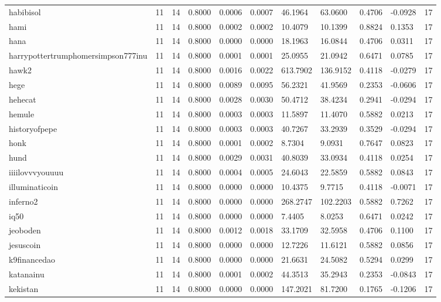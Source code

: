\begin{table}[htbp]
\begin{tabular}{lllllllllll}
habibisol & 11 & 14 & 0.8000 & 0.0006 & 0.0007 & 46.1964 & 63.0600 & 0.4706 & -0.0928 & 17 \\
hami & 11 & 14 & 0.8000 & 0.0002 & 0.0002 & 10.4079 & 10.1399 & 0.8824 & 0.1353 & 17 \\
hana & 11 & 14 & 0.8000 & 0.0000 & 0.0000 & 18.1963 & 16.0844 & 0.4706 & 0.0311 & 17 \\
harrypottertrumphomersimpson777inu & 11 & 14 & 0.8000 & 0.0001 & 0.0001 & 25.0955 & 21.0942 & 0.6471 & 0.0785 & 17 \\
hawk2 & 11 & 14 & 0.8000 & 0.0016 & 0.0022 & 613.7902 & 136.9152 & 0.4118 & -0.0279 & 17 \\
hege & 11 & 14 & 0.8000 & 0.0089 & 0.0095 & 56.2321 & 41.9569 & 0.2353 & -0.0606 & 17 \\
hehecat & 11 & 14 & 0.8000 & 0.0028 & 0.0030 & 50.4712 & 38.4234 & 0.2941 & -0.0294 & 17 \\
hemule & 11 & 14 & 0.8000 & 0.0003 & 0.0003 & 11.5897 & 11.4070 & 0.5882 & 0.0213 & 17 \\
historyofpepe & 11 & 14 & 0.8000 & 0.0003 & 0.0003 & 40.7267 & 33.2939 & 0.3529 & -0.0294 & 17 \\
honk & 11 & 14 & 0.8000 & 0.0001 & 0.0002 & 8.7304 & 9.0931 & 0.7647 & 0.0823 & 17 \\
hund & 11 & 14 & 0.8000 & 0.0029 & 0.0031 & 40.8039 & 33.0934 & 0.4118 & 0.0254 & 17 \\
iiiilovvvyouuuu & 11 & 14 & 0.8000 & 0.0004 & 0.0005 & 24.6043 & 22.5859 & 0.5882 & 0.0843 & 17 \\
illuminaticoin & 11 & 14 & 0.8000 & 0.0000 & 0.0000 & 10.4375 & 9.7715 & 0.4118 & -0.0071 & 17 \\
inferno2 & 11 & 14 & 0.8000 & 0.0000 & 0.0000 & 268.2747 & 102.2203 & 0.5882 & 0.7262 & 17 \\
iq50 & 11 & 14 & 0.8000 & 0.0000 & 0.0000 & 7.4405 & 8.0253 & 0.6471 & 0.0242 & 17 \\
jeoboden & 11 & 14 & 0.8000 & 0.0012 & 0.0018 & 33.1709 & 32.5958 & 0.4706 & 0.1100 & 17 \\
jesuscoin & 11 & 14 & 0.8000 & 0.0000 & 0.0000 & 12.7226 & 11.6121 & 0.5882 & 0.0856 & 17 \\
k9financedao & 11 & 14 & 0.8000 & 0.0000 & 0.0000 & 21.6631 & 24.5082 & 0.5294 & 0.0299 & 17 \\
katanainu & 11 & 14 & 0.8000 & 0.0001 & 0.0002 & 44.3513 & 35.2943 & 0.2353 & -0.0843 & 17 \\
kekistan & 11 & 14 & 0.8000 & 0.0000 & 0.0000 & 147.2021 & 81.7200 & 0.1765 & -0.1206 & 17 \\

\end{tabular}
\end{table}
